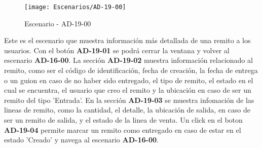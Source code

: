 \begin{figure}[H]
\centering
\texttt{[image: Escenarios/AD-19-00]}
\caption{Escenario - AD-19-00}
\label{fig:AD-19-00}
\end{figure}
Este es el escenario que muestra información más detallada de una remito a los usuarios.
Con el botón \textbf{AD-19-01} se podrá cerrar la ventana y volver al escenario \textbf{AD-16-00}. La sección \textbf{AD-19-02} muestra información relacionado al remito, como ser el código de identificación, fecha de creación, la fecha de entrega o un guion en caso de no haber sido entregado, el tipo de remito, el estado en el cual se encuentra, el usuario que creo el remito y la ubicación en caso de ser un remito del tipo 'Entrada'.
En la sección \textbf{AD-19-03} se muestra infomación de las lineas de remito, como la cantidad, el detalle, la ubicación de salida, en caso de ser un remito de salida, y el estado de la linea de venta. Un click en el boton \textbf{AD-19-04} permite marcar un remito como entregado en caso de estar en el estado 'Creado' y navega al escenario \textbf{AD-16-00}. 
\\